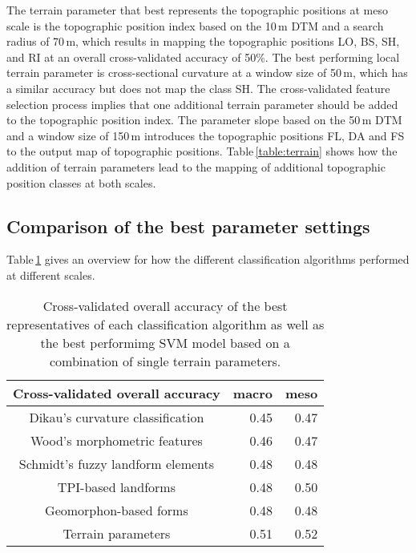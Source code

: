 \documentclass[preprint,12pt,authoryear]{elsarticle}
\begin{document}
The terrain parameter that best represents the topographic positions at meso scale is the topographic position index based on the 10\,m DTM and a search radius of 70\,m, which results in mapping the topographic positions LO, BS, SH, and RI at an overall cross-validated accuracy of 50\%. The best performing local terrain parameter is cross-sectional curvature at a window size of 50\,m, which has a similar accuracy but does not map the class SH. The cross-validated feature selection process implies that one additional terrain parameter should be added to the topographic position index. The parameter slope based on the 50\,m DTM and a window size of 150\,m introduces the topographic positions FL, DA and FS to the output map of topographic positions. Table\,\ref{table:terrain} shows how the addition of terrain parameters lead to the mapping of additional topographic position classes at both scales.

\subsection{Comparison of the best parameter settings}
Table\,\ref{table:overall_comparison} gives an overview for how the different classification algorithms performed at different scales.

\begin{table}[ht]
\caption{Cross-validated overall accuracy of the best representatives of each classification algorithm as well as the best performimg SVM model based on a combination of single terrain parameters.}
\centering
\begin{tabular}{crr}
  \hline
Cross-validated overall accuracy & macro   & meso \\ 
  \hline 
Dikau's curvature classification & 0.45  & 0.47 \\ 
  Wood's morphometric features & 0.46  & 0.47  \\ 
  Schmidt's fuzzy landform elements & 0.48   & 0.48  \\ 
  TPI-based landforms & 0.48  & 0.50  \\ 
  Geomorphon-based forms & 0.48   & 0.48   \\ 
  Terrain parameters & 0.51  & 0.52   \\ 
   \hline
\end{tabular}
\label{table:overall_comparison}
\end{table}
\end{document}
